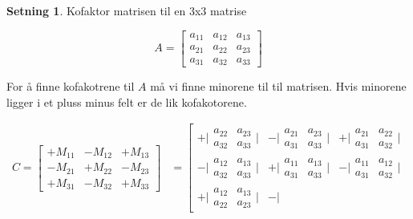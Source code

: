 \documentclass[11pt]{article}
\theoremstyle{definition}
\theoremstyle{definition}
\theoremstyle{definition}
\newtheorem{minset}{Setning}[section]
\newenvironment{fminset}
{\begin{mdframed}[style=minstil]\begin{minset}}
		{\end{minset}\end{mdframed}}
\theoremstyle{definition}
\theoremstyle{definition}
\theoremstyle{definition}
\begin{document}
		\begin{fminset}
			Kofaktor matrisen til en 3x3 matrise
			
			\[A=\left[\begin{array}{rrr} 
			a_{11} & a_{12} & a_{13} \\
			a_{21} & a_{22} & a_{23} \\
			a_{31} & a_{32} & a_{33}
			\end{array} \right]
			\]
			
			For å finne kofakotrene til \(A\) må vi finne minorene til til matrisen. Hvis minorene ligger i et pluss minus felt er de lik kofakotorene.
			
			\begin{align*}
			C=\left[\begin{array}{rrr} 
			+M_{11} & -M_{12} & +M_{13} \\
			-M_{21} & +M_{22} & -M_{23} \\
			+M_{31} & -M_{32} & +M_{33}
			\end{array} \right]&=
			\left[\begin{array}{ccc} 
			+\Big| \begin{array}{cc}
			a_{22} & a_{23} \\ a_{32} & a_{33}
			\end{array}\Big|  & -\Big| \begin{array}{cc}
			a_{21} & a_{23} \\ a_{31} & a_{33}
			\end{array}\Big| & +\Big| \begin{array}{cc}
			a_{21} & a_{22} \\ a_{31} & a_{32}
			\end{array}\Big| \\
			-\Big| \begin{array}{cc}
			a_{12} & a_{13} \\ a_{32} & a_{33}
			\end{array}\Big| & +\Big| \begin{array}{cc}
			a_{11} & a_{13} \\ a_{31} & a_{33}
			\end{array}\Big| & -\Big| \begin{array}{cc}
			a_{11} & a_{12} \\ a_{31} & a_{32}
			\end{array}\Big| \\
			+\Big| \begin{array}{cc}
			a_{12} & a_{13} \\ a_{22} & a_{23}
			\end{array}\Big| & -\Big| \begin{array}{cc}

\end{array}
\end{array}
\end{align*}
\end{fminset}
\end{document}
